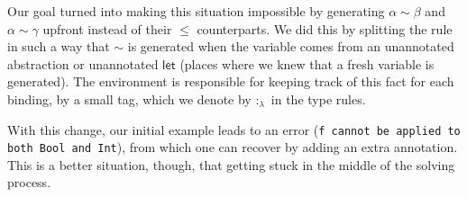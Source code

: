 \documentclass[12pt]{article}
\begin{document}
Our goal turned into making this situation impossible by generating $\alpha \sim \beta$ and $\alpha \sim \gamma$ upfront instead of their $\leq$ counterparts. We did this by splitting the {\sc [VarCon]} rule in such a way that $\sim$ is generated when the variable comes from an unannotated abstraction or unannotated $\mathsf{let}$ (places where we knew that a fresh variable is generated). The environment is responsible for keeping track of this fact for each binding, by a small tag, which we denote by $:_\lambda$ in the type rules.
\begin{prooftree}
\end{prooftree}
\begin{prooftree}
\end{prooftree}
\begin{prooftree}
\end{prooftree}
With this change, our initial example leads to an error ({\tt f cannot be applied to both Bool and Int}), from which one can recover by adding an extra annotation. This is a better situation, though, that getting stuck in the middle of the solving process.

\
\end{document}
